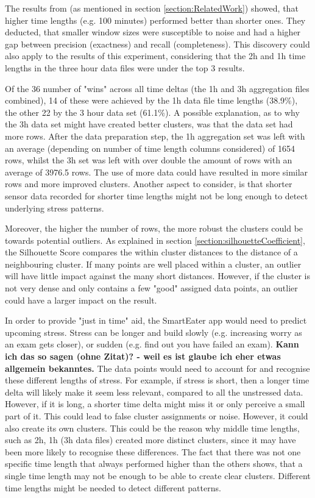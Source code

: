 The results from \textcite{AboutToEat2016Rahman} (as mentioned in section \ref{section:RelatedWork}) showed, that higher time lengths (e.g. 100 minutes) performed better than shorter ones. They deducted, that smaller window sizes were susceptible to noise and had a higher gap between precision (exactness) and recall (completeness). 
This discovery could also apply to the results of this experiment, considering that the 2h and 1h time lengths in the three hour data files were under the top 3 results.


Of the 36 number of "wins" across all time deltas (the 1h and 3h aggregation files combined), 14 of these were achieved by the 1h data file time lengths (38.9\%), the other 22 by the 3 hour data set (61.1\%). A possible explanation, as to why the 3h data set might have created better clusters, was that the data set had more rows. After the data preparation step, the 1h aggregation set was left with an average (depending on number of time length columns considered) of 1654 rows, whilst the 3h set was left with over double the amount of rows with an average of 3976.5 rows. The use of more data could have resulted in more similar rows and more improved clusters. Another aspect to consider, is that shorter sensor data recorded for shorter time lengths might not be long enough to detect underlying stress patterns.

Moreover, the higher the number of rows, the more robust the clusters could be towards potential outliers. As explained in section \ref{section:silhouetteCoefficient}, the Silhouette Score compares the within cluster distances to the distance of a neighbouring cluster. If many points are well placed within a cluster, an outlier will have little impact against the many short distances. However, if the cluster is not very dense and only contains a few "good" assigned data points, an outlier could have a larger impact on the result.


In order to provide "just in time" aid, the SmartEater app would need to predict upcoming stress. Stress can be longer and build slowly (e.g. increasing worry as an exam gets closer), or sudden (e.g. find out you have failed an exam). \textbf{Kann ich das so sagen (ohne Zitat)? - weil es ist glaube ich eher etwas allgemein bekanntes.} The data points would need to account for and recognise these different lengths of stress. For example, if stress is short, then a longer time delta will likely make it seem less relevant, compared to all the unstressed data. However, if it is long, a shorter time delta might miss it or only perceive a small part of it. This could lead to false cluster assignments or noise. However, it could also create its own clusters. This could be the reason why middle time lengths, such as 2h, 1h (3h data files) created more distinct clusters, since it may have been more likely to recognise these differences. The fact that there was not one specific time length that always performed higher than the others shows, that a single time length may not be enough to be able to create clear clusters. Different time lengths might be needed to detect different patterns.

